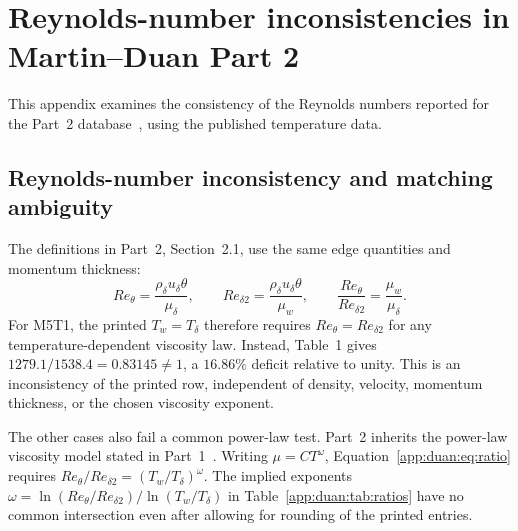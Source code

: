 \chapter{Reynolds-number inconsistencies in Martin--Duan Part 2}
\label{app:duan-part2-consistency}

This appendix examines the consistency of the Reynolds numbers reported for the Part~2 database~\cite{duan2010direct_part2}, using the published temperature data.

\section{Reynolds-number inconsistency and matching ambiguity}
\label{app:duan:reynolds}

The definitions in Part~2, Section~2.1, use the same edge quantities and momentum thickness:
\begin{equation}
  Re_\theta=\frac{\rho_\delta u_\delta\theta}{\mu_\delta},
  \qquad
  Re_{\delta2}=\frac{\rho_\delta u_\delta\theta}{\mu_w},
  \qquad
  \boxed{\frac{Re_\theta}{Re_{\delta2}}=\frac{\mu_w}{\mu_\delta}}.
  \label{app:duan:eq:ratio}
\end{equation}
For M5T1, the printed \(T_w=T_\delta\) therefore requires \(Re_\theta=Re_{\delta2}\) for any temperature-dependent viscosity law. Instead, Table~1 gives \(1279.1/1538.4=0.83145\ne1\), a \(16.86\%\) deficit relative to unity. This is an inconsistency of the printed row, independent of density, velocity, momentum thickness, or the chosen viscosity exponent.

The other cases also fail a common power-law test. Part~2 inherits the power-law viscosity model stated in Part~1~\cite[Section~2]{martin2007direct_Part1}. Writing \(\mu=CT^\omega\), Equation~\eqref{app:duan:eq:ratio} requires \(Re_\theta/Re_{\delta2}=(T_w/T_\delta)^\omega\). The implied exponents \(\omega=\ln(Re_\theta/Re_{\delta2})/\ln(T_w/T_\delta)\) in Table~\ref{app:duan:tab:ratios} have no common intersection even after allowing for rounding of the printed entries.

